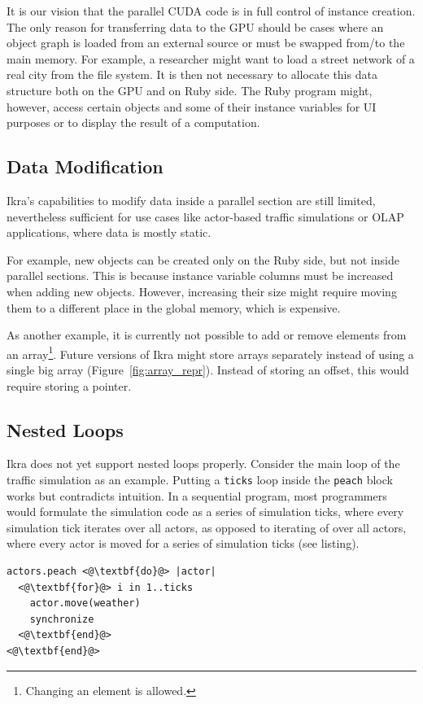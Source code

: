 \documentclass[preprint]{sigplanconf}
\begin{document}
It is our vision that the parallel CUDA code is in full control of instance creation. The only reason for transferring data to the GPU should be cases where an object graph is loaded from an external source or must be swapped from/to the main memory. For example, a researcher might want to load a street network of a real city from the file system. It is then not necessary to allocate this data structure both on the GPU and on Ruby side. The Ruby program might, however, access certain objects and some of their instance variables for UI purposes or to display the result of a computation.

\subsection{Data Modification}
\label{sec:gen_new_obj}
Ikra's capabilities to modify data inside a parallel section are still limited, nevertheless sufficient for use cases like actor-based traffic simulations or OLAP applications, where data is mostly static.

For example, new objects can be created only on the Ruby side, but not inside parallel sections. This is because instance variable columns must be increased when adding new objects. However, increasing their size might require moving them to a different place in the global memory, which is expensive.

As another example, it is currently not possible to add or remove elements from an array\footnote{Changing an element is allowed.}. Future versions of Ikra might store arrays separately instead of using a single big array (Figure~\ref{fig:array_repr}). Instead of storing an offset, this would require storing a pointer.

\balance

\subsection{Nested Loops}
\label{sec:nested_loops}
Ikra does not yet support nested loops properly. Consider the main loop of the traffic simulation as an example. Putting a \texttt{ticks} loop inside the \texttt{peach} block works but contradicts intuition. In a sequential program, most programmers would formulate the simulation code as a series of simulation ticks, where every simulation tick iterates over all actors, as opposed to iterating of over all actors, where every actor is moved for a series of simulation ticks (see listing).

\begin{lstlisting}
actors.peach <@\textbf{do}@> |actor|
  <@\textbf{for}@> i in 1..ticks
    actor.move(weather)
    synchronize
  <@\textbf{end}@>
<@\textbf{end}@>
\end{lstlisting}
\end{document}
